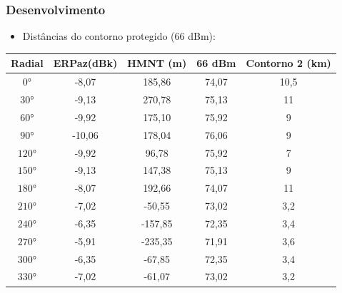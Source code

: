 \documentclass{beamer}
\begin{document}
  
      \begin{frame}
    
      \frametitle{Desenvolvimento}
      
      \begin{itemize}
      
      \item Distâncias do contorno protegido (66 dBm):
      
      \end{itemize}
      
      \begin{center}
  
	  \def\tablename{Tabela}
	  \begin{table}
	  \vspace*{0.05cm}
	  \centering

	  \begin{tabular}{|c|c|c|c|c|} \hline

	  Radial& ERPaz(dBk) & HMNT (m) & 66 dBm & Contorno 2 (km)\\\hline\hline
	  $0°$  & -8,07 &185,86 &74,07 &10,5\\\hline
	  $30°$ & -9,13 &270,78 &75,13 &11  \\\hline
	  $60°$ & -9,92 &175,10 &75,92 &9   \\\hline
	  $90°$ & -10,06&178,04 &76,06 &9   \\\hline
	  $120°$& -9,92 &96,78  &75,92 &7   \\\hline
	  $150°$& -9,13 &147,38 &75,13 &9   \\\hline
	  $180°$& -8,07 &192,66 &74,07 &11  \\\hline
	  $210°$& -7,02 &-50,55 &73,02 &3,2 \\\hline
	  $240°$& -6,35 &-157,85&72,35 &3,4 \\\hline
	  $270°$& -5,91 &-235,35&71,91 &3,6 \\\hline
	  $300°$& -6,35 &-67,85 &72,35 &3,4 \\\hline
	  $330°$& -7,02 &-61,07 &73,02 &3,2 \\\hline

	  \end{tabular}
	  \label{tabelaContorno2}
	  \end{table}
	      
    
            \end{center}
      
  \end{frame}
  
       
 
\end{document}

